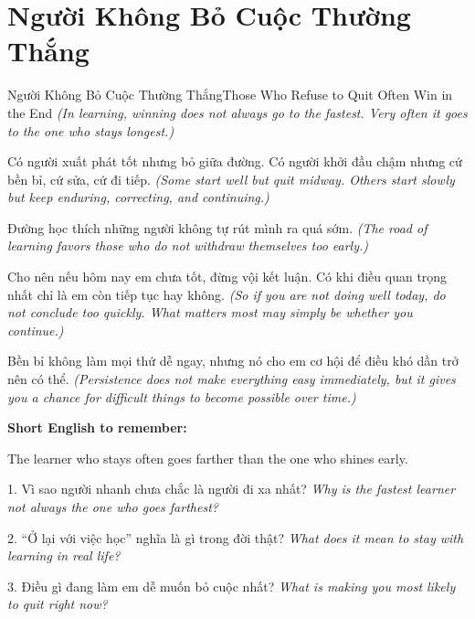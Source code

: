 \section{Người Không Bỏ Cuộc Thường Thắng}
\begin{truyen}{Người Không Bỏ Cuộc Thường Thắng}{Those Who Refuse to Quit Often Win in the End}
\textit{(In learning, winning does not always go to the fastest. Very often it goes to the one who stays longest.)}

Có người xuất phát tốt nhưng bỏ giữa đường. Có người khởi đầu chậm nhưng cứ bền bỉ, cứ sửa, cứ đi tiếp.
\textit{(Some start well but quit midway. Others start slowly but keep enduring, correcting, and continuing.)}

Đường học thích những người không tự rút mình ra quá sớm.
\textit{(The road of learning favors those who do not withdraw themselves too early.)}

Cho nên nếu hôm nay em chưa tốt, đừng vội kết luận. Có khi điều quan trọng nhất chỉ là em còn tiếp tục hay không.
\textit{(So if you are not doing well today, do not conclude too quickly. What matters most may simply be whether you continue.)}
\end{truyen}

\begin{baihoc}
Bền bỉ không làm mọi thứ dễ ngay, nhưng nó cho em cơ hội để điều khó dần trở nên có thể.
\textit{(Persistence does not make everything easy immediately, but it gives you a chance for difficult things to become possible over time.)}
\end{baihoc}

\begin{ghinhoanh}
\textbf{Short English to remember:}

The learner who stays often goes farther than the one who shines early.

\end{ghinhoanh}

\begin{tuhocnhanh}
1. Vì sao người nhanh chưa chắc là người đi xa nhất? \textit{Why is the fastest learner not always the one who goes farthest?}

2. “Ở lại với việc học” nghĩa là gì trong đời thật? \textit{What does it mean to stay with learning in real life?}

3. Điều gì đang làm em dễ muốn bỏ cuộc nhất? \textit{What is making you most likely to quit right now?}
\end{tuhocnhanh}
\ngancach
